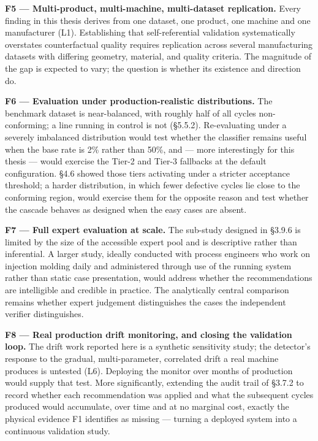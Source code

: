 \textbf{F5 --- Multi-product, multi-machine, multi-dataset replication.} Every finding in this thesis derives from one dataset, one product, one machine and one manufacturer (L1). Establishing that self-referential validation systematically overstates counterfactual quality requires replication across several manufacturing datasets with differing geometry, material, and quality criteria. The magnitude of the gap is expected to vary; the question is whether its existence and direction do.

\textbf{F6 --- Evaluation under production-realistic distributions.} The benchmark dataset is near-balanced, with roughly half of all cycles non-conforming; a line running in control is not (§5.5.2). Re-evaluating under a severely imbalanced distribution would test whether the classifier remains useful when the base rate is 2\% rather than 50\%, and --- more interestingly for this thesis --- would exercise the Tier-2 and Tier-3 fallbacks at the default configuration. §4.6 showed those tiers activating under a stricter acceptance threshold; a harder distribution, in which fewer defective cycles lie close to the conforming region, would exercise them for the opposite reason and test whether the cascade behaves as designed when the easy cases are absent.

\textbf{F7 --- Full expert evaluation at scale.} The sub-study designed in §3.9.6 is limited by the size of the accessible expert pool and is descriptive rather than inferential. A larger study, ideally conducted with process engineers who work on injection molding daily and administered through use of the running system rather than static case presentation, would address whether the recommendations are intelligible and credible in practice. The analytically central comparison remains whether expert judgement distinguishes the cases the independent verifier distinguishes.

\textbf{F8 --- Real production drift monitoring, and closing the validation loop.} The drift work reported here is a synthetic sensitivity study; the detector's response to the gradual, multi-parameter, correlated drift a real machine produces is untested (L6). Deploying the monitor over months of production would supply that test. More significantly, extending the audit trail of §3.7.2 to record whether each recommendation was applied and what the subsequent cycles produced would accumulate, over time and at no marginal cost, exactly the physical evidence F1 identifies as missing --- turning a deployed system into a continuous validation study.

